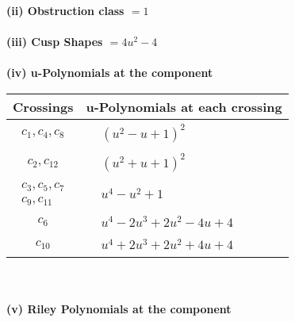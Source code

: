 \documentclass[1p]{elsarticle_modified}
\theoremstyle{definition}
\begin{document}
\flushleft \textbf{(ii) Obstruction class $= 1$}\\~\\
\flushleft \textbf{(iii) Cusp Shapes $= 4 u^2-4$}\\~\\
\newpage\renewcommand{\arraystretch}{1}
\flushleft \textbf{(iv) u-Polynomials at the component}\newline \\
\begin{tabular}{m{50pt}|m{274pt}}
Crossings & \hspace{64pt}u-Polynomials at each crossing \\
\hline $$\begin{aligned}c_{1},c_{4},c_{8}\end{aligned}$$&$\begin{aligned}
&(u^2- u+1)^2
\end{aligned}$\\
\hline $$\begin{aligned}c_{2},c_{12}\end{aligned}$$&$\begin{aligned}
&(u^2+u+1)^2
\end{aligned}$\\
\hline $$\begin{aligned}c_{3},c_{5},c_{7}\\c_{9},c_{11}\end{aligned}$$&$\begin{aligned}
&u^4- u^2+1
\end{aligned}$\\
\hline $$\begin{aligned}c_{6}\end{aligned}$$&$\begin{aligned}
&u^4-2 u^3+2 u^2-4 u+4
\end{aligned}$\\
\hline $$\begin{aligned}c_{10}\end{aligned}$$&$\begin{aligned}
&u^4+2 u^3+2 u^2+4 u+4
\end{aligned}$\\
\hline
\end{tabular}\\~\\
\newpage\renewcommand{\arraystretch}{1}
\flushleft \textbf{(v) Riley Polynomials at the component}\newline \\
\end{document}
